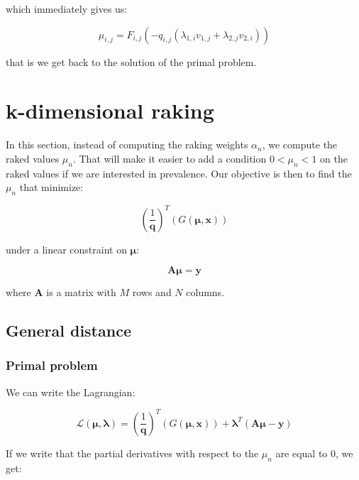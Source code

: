 \documentclass{tex/note}
\begin{document}
which immediately gives us:

\begin{equation*}
\mu_{i,j} = F_{i,j} \left( - q_{i,j} \left( \lambda_{1,i} v_{1,j} + \lambda_{2,j} v_{2,i} \right) \right)
\end{equation*}

that is we get back to the solution of the primal problem.

\section{k-dimensional raking}

In this section, instead of computing the raking weights $\alpha_n$, we compute the raked values $\mu_n$. That will make it easier to add a condition $0 < \mu_n < 1$ on the raked values if we are interested in prevalence. Our objective is then to find the $\mu_n$ that minimize:

\begin{equation*}
\left( \frac{1}{\bm{q}} \right)^T \left( G \left( \bm{\mu} , \bm{x} \right) \right)
\end{equation*}

under a linear constraint on $\bm{\mu}$:

\begin{equation*}
\bm{A} \bm{\mu} = \bm{y}
\end{equation*}

where $\bm{A}$ is a matrix with $M$ rows and $N$ columns.

\subsection{General distance}

\subsubsection{Primal problem}

We can write the Lagrangian:

\begin{equation*}
\mathcal{L} \left( \bm{\mu} , \bm{\lambda} \right) = \left( \frac{1}{\bm{q}} \right)^T \left( G \left( \bm{\mu} , \bm{x} \right) \right) + \bm{\lambda}^T \left( \bm{A} \bm{\mu} - \bm{y} \right)
\end{equation*}

If we write that the partial derivatives with respect to the $\mu_n$ are equal to $0$, we get:
\end{document}

